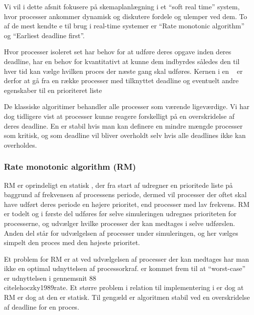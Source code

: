\begin{shaded}
Vi vil i dette afsnit fokusere på skemaplanlægning i et ``soft real time'' system, hvor processer ankommer dynamisk og diskutere fordele og ulemper ved dem.
To af de mest kendte \sched e til brug i real-time systemer er ``Rate monotonic algorithm''\cite{lehoczky1989rate,liu1973scheduling} og ``Earliest deadline first''\cite{liu1973scheduling}.


Hvor processer isoleret set har behov for at udføre deres opgave inden deres deadline, har \sched en behov for kvantitativt at kunne  dem indbyrdes således den til hver tid kan vælge hvilken proces der næste gang skal udføres. Kernen i en  \sched ~ er derfor at gå fra en række processer med tilknyttet deadline og eventuelt andre egenskaber til en prioriteret liste 

De klassiske algoritimer behandler alle processer som værende ligeværdige. Vi har dog tidligere vist at processer kunne reagere forskelligt på en overskridelse af deres deadline. En \sched er stabil hvis man kan definere en mindre mængde processer som kritisk, og som deadline vil bliver overholdt selv hvis alle deadlines ikke kan overholdes.
\end{shaded}

\subsubsection{Rate monotonic algorithm (RM)}
RM er oprindeligt en statisk \sched, der fra start af udregner en prioritede liste på baggrund af frekvensen af processens periode, dermed vil processer der oftet skal have udført deres periode en højere prioritet, end processer med lav frekvens. RM er todelt og i første del udføres før selve simuleringen udregnes  prioriteten for processerne, og udvælger hvilke processer der kan medtages i selve udførslen. Anden del står for udvælgelsen af processer  under simuleringen, og her vælges simpelt den proces med den højeste prioritet. 

 Et problem for RM er at ved udvælgelsen af processer der kan medtages har man ikke en optimal udnyttelsen af processorkraf.  er kommet frem til at ``worst-case'' er udnyttelsen i gennemsnit 88\\cite{lehoczky1989rate}. Et større problem i relation til implementering i \pycsp er dog at RM er dog at den er statisk. Til gengæld er algoritmen stabil ved en overskridelse af deadline for en proces. 

